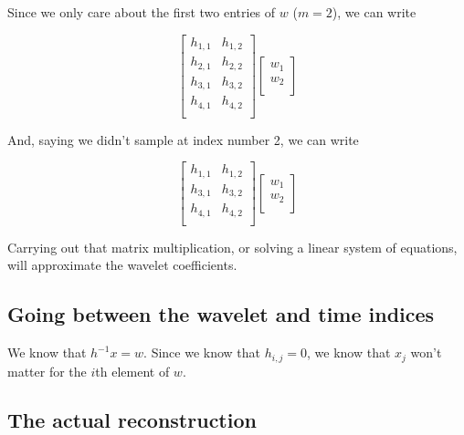 \documentclass[leqno]{article}
\begin{document}
            Since we only care about the first two entries of $w$ ($m=2$), we can write

            $$
                \begin{bmatrix}  
                    h_{1,1} & h_{1,2}  \\
                    h_{2,1} & h_{2,2}  \\
                    h_{3,1} & h_{3,2}  \\
                    h_{4,1} & h_{4,2}  \\
                
                \end{bmatrix}
                \begin{bmatrix}
                    w_1 \\ w_2 \\ 
                \end{bmatrix}
            $$

            And, saying we didn't sample at index number 2, we can write

            $$
                \begin{bmatrix}  
                    h_{1,1} & h_{1,2}  \\
                    h_{3,1} & h_{3,2}  \\
                    h_{4,1} & h_{4,2}  \\
                
                \end{bmatrix}
                \begin{bmatrix}
                    w_1 \\ w_2 \\ 
                \end{bmatrix}
            $$

            Carrying out that matrix multiplication, or solving a linear system of equations, will approximate the wavelet coefficients.

        \subsection{Going between the wavelet and time indices}

            We know that $h^{-1} x = w $. Since we know that  $h_{i, j} = 0$, we know that $x_j$ won't matter for the $i$th element of $w$.
            
        \subsection{The actual reconstruction}
\end{document}
